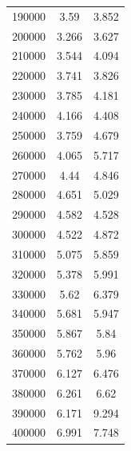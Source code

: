 \documentclass{article}
\begin{document}
\begin{longtable}{c|c|c}
           190000 &                      3.59  &                      3.852 \\
           200000 &                      3.266 &                      3.627 \\
           210000 &                      3.544 &                      4.094 \\
           220000 &                      3.741 &                      3.826 \\
           230000 &                      3.785 &                      4.181 \\
           240000 &                      4.166 &                      4.408 \\
           250000 &                      3.759 &                      4.679 \\
           260000 &                      4.065 &                      5.717 \\
           270000 &                      4.44  &                      4.846 \\
           280000 &                      4.651 &                      5.029 \\
           290000 &                      4.582 &                      4.528 \\
           300000 &                      4.522 &                      4.872 \\
           310000 &                      5.075 &                      5.859 \\
           320000 &                      5.378 &                      5.991 \\
           330000 &                      5.62  &                      6.379 \\
           340000 &                      5.681 &                      5.947 \\
           350000 &                      5.867 &                      5.84  \\
           360000 &                      5.762 &                      5.96  \\
           370000 &                      6.127 &                      6.476 \\
           380000 &                      6.261 &                      6.62  \\
           390000 &                      6.171 &                      9.294 \\
           400000 &                      6.991 &                      7.748 \\

\end{longtable}
\end{document}
